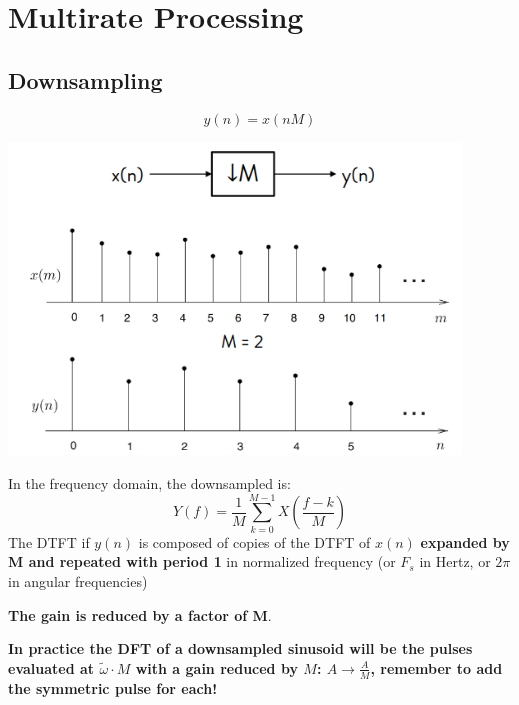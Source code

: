 
\section{Multirate Processing}
\subsection{Downsampling}
    \begin{LARGE}
        $$
        y(n)=x(nM)
        $$
    \end{LARGE}
    \begin{center}
        \includegraphics[width=0.9\textwidth]{images/downsampling.png}
    \end{center}
    In the frequency domain, the downsampled is:
    $$
    Y(f)=\frac{1}{M}\sum_{k=0}^{M-1}X\left(\frac{f-k}{M}\right)
    $$
    The DTFT if $y(n)$ is composed of copies of the DTFT of $x(n)$ \textbf{expanded by M and repeated with period 1} in normalized frequency (or $F_s$ in Hertz, or $2\pi$ in angular frequencies)

    \textbf{The gain is reduced by a factor of M}.
    
    \textbf{In practice the DFT of a downsampled sinusoid will be the pulses evaluated at $\tilde{\omega}\cdot M$ with a gain reduced by $M$: $A\rightarrow \frac{A}{M}$, remember to add the symmetric pulse for each!}

